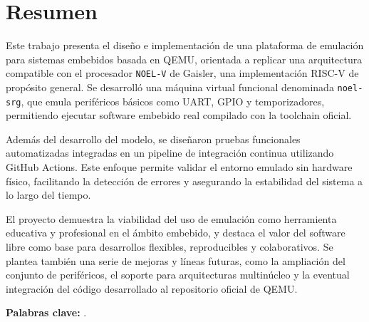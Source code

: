 %
%
%
% 
%
%
%
%

\chapter*{Resumen}
\label{cha:resumen}


Este trabajo presenta el diseño e implementación de una plataforma de emulación para sistemas embebidos basada en QEMU, orientada a replicar una arquitectura compatible con el procesador \texttt{NOEL-V} de Gaisler, una implementación RISC-V de propósito general. Se desarrolló una máquina virtual funcional denominada \texttt{noel-srg}, que emula periféricos básicos como UART, GPIO y temporizadores, permitiendo ejecutar software embebido real compilado con la toolchain oficial.

Además del desarrollo del modelo, se diseñaron pruebas funcionales automatizadas integradas en un pipeline de integración continua utilizando GitHub Actions. Este enfoque permite validar el entorno emulado sin hardware físico, facilitando la detección de errores y asegurando la estabilidad del sistema a lo largo del tiempo.

El proyecto demuestra la viabilidad del uso de emulación como herramienta educativa y profesional en el ámbito embebido, y destaca el valor del software libre como base para desarrollos flexibles, reproducibles y colaborativos. Se plantea también una serie de mejoras y líneas futuras, como la ampliación del conjunto de periféricos, el soporte para arquitecturas multinúcleo y la eventual integración del código desarrollado al repositorio oficial de QEMU.


\textbf{Palabras clave:} \myThesisKeywords.



